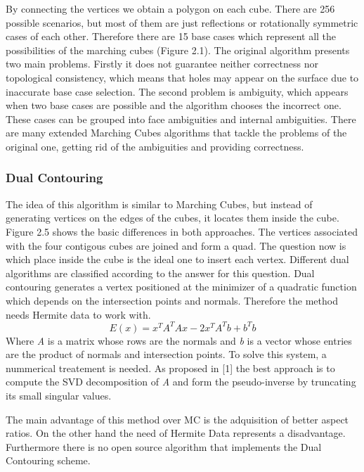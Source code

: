 By connecting the vertices we obtain a polygon on each cube. There are 256 possible scenarios,
but most of them are just reflections or rotationally symmetric cases of each other. Therefore
there are 15 base cases which represent all the possibilities of the marching cubes (Figure 2.1). 
The original algorithm presents two main problems. Firstly it does not guarantee neither
correctness nor topological consistency, which means that holes may appear on the surface due
to inaccurate base case selection. The second problem is ambiguity, which appears when two
base cases are possible and the algorithm chooses the incorrect one. These cases can be grouped
into face ambiguities and internal ambiguities. There are many extended Marching Cubes
algorithms that tackle the problems of the original one, getting rid of the ambiguities and
providing correctness.

\subsubsection{Dual Contouring}
The idea of this algorithm is similar to Marching Cubes, but instead of generating vertices on the
edges of the cubes, it locates them inside the cube. Figure 2.5 shows the basic differences in both approaches.
The vertices associated with the four contigous cubes are joined and form a quad. The question now is
which place inside the cube is the ideal one to insert each vertex. Different dual algorithms are classified 
according to the answer for this question. Dual contouring generates a vertex positioned at the minimizer of a
quadratic function which depends on the intersection points and normals. Therefore the method needs Hermite 
data to work with.
\begin{equation*}
E(x)= x^TA^TAx-2x^TA^Tb+b^Tb
\end{equation*}
Where \textit{A} is a matrix whose rows are the normals and \textit{b} is a vector whose entries are the product of normals and intersection points. To solve this system, a nummerical treatement is needed. As proposed in [1] the best approach is to compute the
SVD decomposition of \textit{A} and form the pseudo-inverse by truncating its small singular values. 


The main advantage of this method over MC is the adquisition of better aspect ratios. On the other hand the need of Hermite Data
represents a disadvantage. Furthermore there is no open source algorithm that implements the Dual Contouring scheme.


